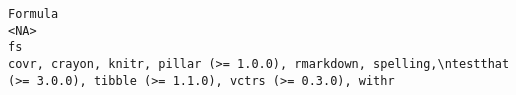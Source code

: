 \documentclass[
  letterpaper,
  DIV=11,
  numbers=noendperiod]{scrreprt}
\begin{document}
\begin{verbatim}
Formula                                                                                                                                                                                                                                                                                                                                                                                                                                                                                                                                                                                                                                                                                                                                                                                                                                                                                                                                                                                                                                                                                                                                                                                                                                                                                                  <NA>
fs                                                                                                                                                                                                                                                                                                                                                                                                                                                                                                                                                                                                                                                                                                                                                                                                                                                                                                                                                                                                                                                                                                                                                                              covr, crayon, knitr, pillar (>= 1.0.0), rmarkdown, spelling,\ntestthat (>= 3.0.0), tibble (>= 1.1.0), vctrs (>= 0.3.0), withr

\end{verbatim}
\end{document}
